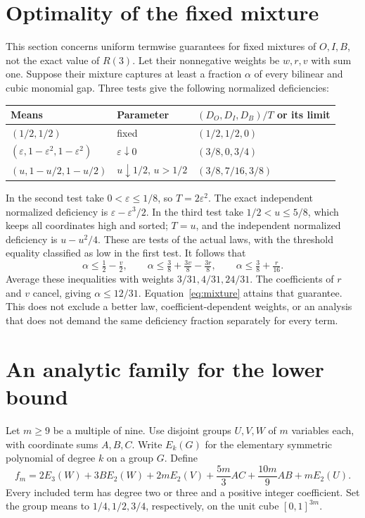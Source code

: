 \documentclass[11pt]{article}
\theoremstyle{remark}
\begin{document}
\section{Optimality of the fixed mixture}\label{sec:optimality}
This section concerns uniform termwise guarantees for fixed mixtures
of $O,I,B$, not the exact value of $R(3)$. Let their nonnegative weights
be $w,r,v$ with sum one. Suppose their mixture captures at least a
fraction $\alpha$ of every bilinear and cubic monomial gap.
Three tests give the following normalized deficiencies:
\begin{center}
\begin{tabular}{lll}
\toprule
Means & Parameter & $(D_O,D_I,D_B)/T$ or its limit\\
\midrule
$(1/2,1/2)$ & fixed & $(1/2,1/2,0)$\\
$(\varepsilon,1-\varepsilon^2,1-\varepsilon^2)$
 & $\varepsilon\downarrow0$ & $(3/8,0,3/4)$\\
$(u,1-u/2,1-u/2)$ & $u\downarrow1/2$, $u>1/2$
 & $(3/8,7/16,3/8)$\\
\bottomrule
\end{tabular}
\end{center}
In the second test take $0<\varepsilon\le1/8$, so $T=2\varepsilon^2$.
The exact independent normalized deficiency is
$\varepsilon-\varepsilon^3/2$. In the third test take $1/2<u\le5/8$,
which keeps all coordinates high and sorted; $T=u$, and the independent
normalized deficiency is $u-u^2/4$. These are tests of the actual
laws, with the threshold equality classified as low in the first test.
It follows that
\[
 \alpha\le\tfrac12-\tfrac v2,\qquad
 \alpha\le\tfrac38+\tfrac{3v}8-\tfrac{3r}8,\qquad
 \alpha\le\tfrac38+\tfrac r{16}.
\]
Average these inequalities with weights $3/31,4/31,24/31$.
The coefficients of $r$ and $v$ cancel, giving $\alpha\le12/31$.
Equation~\eqref{eq:mixture} attains that guarantee. This does not exclude
a better law, coefficient-dependent weights, or an analysis that does
not demand the same deficiency fraction separately for every term.

\section{An analytic family for the lower bound}\label{sec:lower}
Let $m\ge9$ be a multiple of nine. Use disjoint groups $U,V,W$ of
$m$ variables each, with coordinate sums $A,B,C$. Write $E_k(G)$ for
the elementary symmetric polynomial of degree $k$ on a group $G$.
Define
\begin{equation}\label{eq:family}
 f_m=2E_3(W)+3B E_2(W)+2mE_2(V)
       +\frac{5m}{3}AC+\frac{10m}{9}AB+mE_2(U).
\end{equation}
Every included term has degree two or three and a positive integer
coefficient. Set the group means to $1/4,1/2,3/4$, respectively, on the
unit cube $[0,1]^{3m}$.
\end{document}
